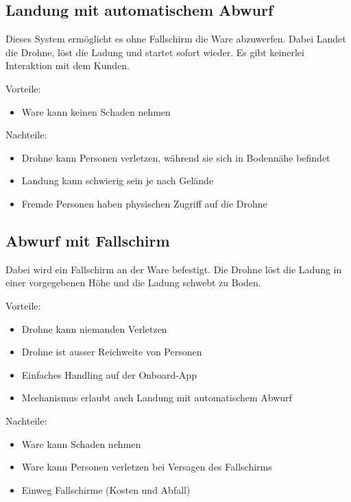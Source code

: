 \subsection{Landung mit automatischem Abwurf}

Dieses System ermöglicht es ohne Fallschirm die Ware abzuwerfen. Dabei Landet die Drohne, löst die Ladung und startet sofort wieder. Es gibt keinerlei Interaktion mit dem Kunden.

Vorteile:
\begin{itemize}
	\item Ware kann keinen Schaden nehmen
\end{itemize}


Nachteile:
\begin{itemize}
	\item Drohne kann Personen verletzen, während sie sich in Bodennähe befindet
	\item Landung kann schwierig sein je nach Gelände
	\item Fremde Personen haben physischen Zugriff auf die Drohne
\end{itemize}


\subsection{Abwurf mit Fallschirm}

Dabei wird ein Fallschirm an der Ware befestigt. Die Drohne löst die Ladung in einer vorgegebenen Höhe und die Ladung schwebt zu Boden.


Vorteile:
\begin{itemize}
	\item Drohne kann niemanden Verletzen 
	\item Drohne ist ausser Reichweite von Personen
	\item Einfaches Handling auf der Onboard-App
	\item Mechanismus erlaubt auch Landung mit automatischem Abwurf
\end{itemize}


Nachteile:
\begin{itemize}
	\item Ware kann Schaden nehmen
	\item Ware kann Personen verletzen bei Versagen des Fallschirms
	\item Einweg Fallschirme (Kosten und Abfall)
\end{itemize}


